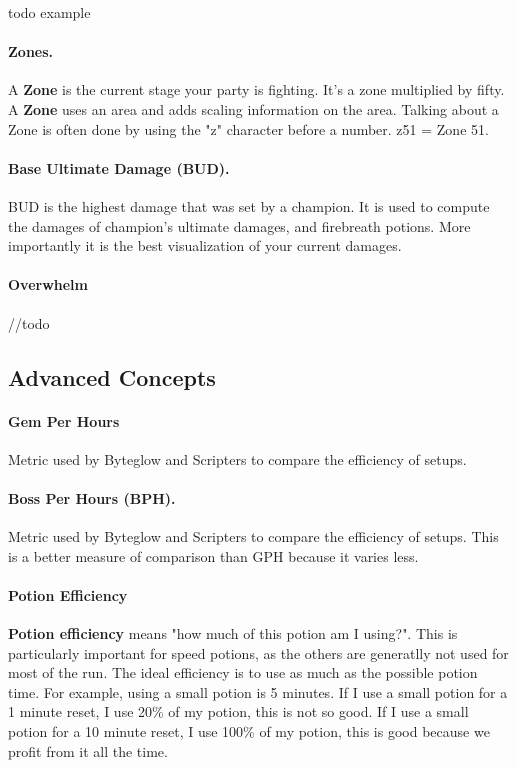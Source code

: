 \documentclass{article}
\begin{document}
todo example
\paragraph{Zones.}
A \textbf{Zone} is the current stage your party is fighting.
It's a zone multiplied by fifty.
A \textbf{Zone} uses an area and adds scaling information on the area.
Talking about a Zone is often done by using the "z" character before a number.
z51 = Zone 51.

\paragraph{Base Ultimate Damage (BUD).}

BUD is the highest damage that was set by a champion.
It is used to compute the damages of champion's ultimate damages, and firebreath potions.
More importantly it is the best visualization of your current damages.


\paragraph{Overwhelm}

//todo

\subsection{Advanced Concepts}

\paragraph{Gem Per Hours}

Metric used by Byteglow and Scripters to compare the efficiency of setups.

\paragraph{Boss Per Hours (BPH).}

Metric used by Byteglow and Scripters to compare the efficiency of setups.
This is a better measure of comparison than GPH because it varies less.


\paragraph{Potion Efficiency}

\textbf{Potion efficiency} means "how much of this potion am I using?".
This is particularly important for speed potions, as the others are generatlly not used for most of the run.
The ideal efficiency is to use as much as the possible potion time.
For example, using a small potion is 5 minutes.
If I use a small potion for a 1 minute reset, I use 20\% of my potion, this is not so good.
If I use a small potion for a 10 minute reset, I use 100\% of my potion, this is good because we profit from it all the time.
\end{document}
